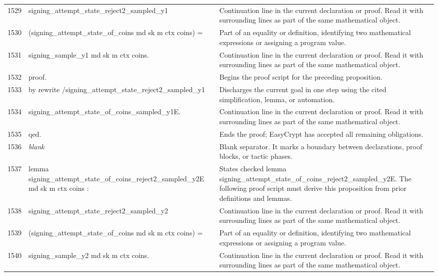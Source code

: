 \documentclass[10pt]{article}
\begin{document}
\begin{longtable}{r L{0.53\textwidth} L{0.37\textwidth}}
1529 & {\ttfamily\scriptsize   signing\_attempt\_state\_reject2\_sampled\_y1} & Continuation line in the current declaration or proof.  Read it with surrounding lines as part of the same mathematical object. \\
1530 & {\ttfamily\scriptsize     (signing\_attempt\_state\_of\_coins md sk m ctx coins) =} & Part of an equality or definition, identifying two mathematical expressions or assigning a program value. \\
1531 & {\ttfamily\scriptsize   signing\_sample\_y1 md sk m ctx coins.} & Continuation line in the current declaration or proof.  Read it with surrounding lines as part of the same mathematical object. \\
1532 & {\ttfamily\scriptsize proof.} & Begins the proof script for the preceding proposition. \\
1533 & {\ttfamily\scriptsize by rewrite /signing\_attempt\_state\_reject2\_sampled\_y1} & Discharges the current goal in one step using the cited simplification, lemma, or automation. \\
1534 & {\ttfamily\scriptsize            signing\_attempt\_state\_of\_coins\_sampled\_y1E.} & Continuation line in the current declaration or proof.  Read it with surrounding lines as part of the same mathematical object. \\
1535 & {\ttfamily\scriptsize qed.} & Ends the proof; EasyCrypt has accepted all remaining obligations. \\
1536 & {\ttfamily\scriptsize \emph{blank}} & Blank separator.  It marks a boundary between declarations, proof blocks, or tactic phases. \\
1537 & {\ttfamily\scriptsize lemma signing\_attempt\_state\_of\_coins\_reject2\_sampled\_y2E md sk m ctx coins :} & States checked lemma signing\_attempt\_state\_of\_coins\_reject2\_sampled\_y2E.  The following proof script must derive this proposition from prior definitions and lemmas. \\
1538 & {\ttfamily\scriptsize   signing\_attempt\_state\_reject2\_sampled\_y2} & Continuation line in the current declaration or proof.  Read it with surrounding lines as part of the same mathematical object. \\
1539 & {\ttfamily\scriptsize     (signing\_attempt\_state\_of\_coins md sk m ctx coins) =} & Part of an equality or definition, identifying two mathematical expressions or assigning a program value. \\
1540 & {\ttfamily\scriptsize   signing\_sample\_y2 md sk m ctx coins.} & Continuation line in the current declaration or proof.  Read it with surrounding lines as part of the same mathematical object. \\

\end{longtable}
\end{document}
